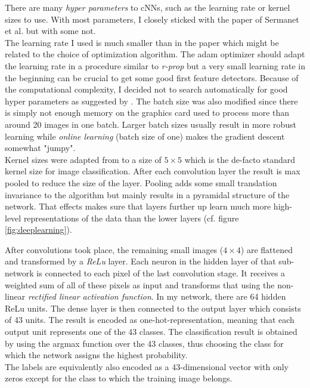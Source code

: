 \documentclass[11pt,a4paper]{article}
\begin{document}
There are many \textit{hyper parameters} to cNNs, such as the learning rate or kernel sizes to use. With most parameters, I closely sticked with the paper of Sermanet et al. \cite{sermanet2011traffic} but with some not.\\
The learning rate I used is much smaller than in the paper which might be related to the choice of optimization algorithm. The adam optimizer should adapt the learning rate in a procedure similar to \textit{r-prop} but a very small learning rate in the beginning can be crucial to get some good first feature detectors. Because of the computational complexity, I decided not to search automatically for good hyper parameters as suggested by \cite{gridsearchHyperparams}. The batch size was also modified since there is simply not enough memory on the graphics card used to process more than around 20 images in one batch. Larger batch sizes usually result in more robust learning while \textit{online learning} (batch size of one) makes the gradient descent somewhat "jumpy".\\
Kernel sizes were adapted from \cite{cnnOriginal} to a size of $5 \times 5$ which is the de-facto standard kernel size for image classification. After each convolution layer the result is max pooled to reduce the size of the layer. Pooling adds some small translation invariance to the algorithm but mainly results in a pyramidal structure of the network. That effects makes sure that layers further up learn much more high-level representations of the data than the lower layers (cf. figure \ref{fig:deeplearning}).

After convolutions took place, the remaining small images ($4 \times 4$) are flattened and transformed by a \textit{ReLu} layer. Each neuron in the hidden layer of that sub-network is connected to each pixel of the last convolution stage. It receives a weighted sum of all of these pixels as input and transforms that using the non-linear \textit{rectified linear activation function}. In my network, there are 64 hidden ReLu units.
The dense layer is then connected to the output layer which consists of 43 units. The result is encoded as one-hot-representation, meaning that each output unit represents one of the 43 classes. The classification result is obtained by using the argmax function over the 43 classes, thus choosing the class for which the network assigns the highest probability.\\
The labels are equivalently also encoded as a 43-dimensional vector with only zeros except for the class to which the training image belongs.
\end{document}
